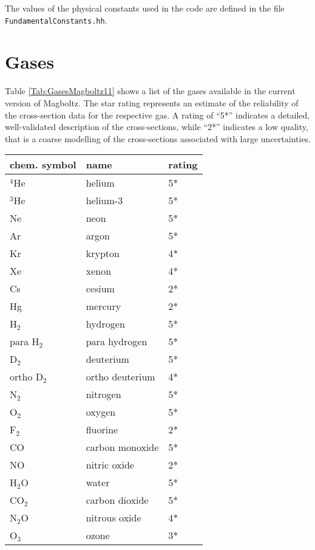 \begin{appendix}
The values of the physical constants used in the code are defined  
in the file \texttt{FundamentalConstants.hh}.

\chapter{Gases}

Table \ref{Tab:GasesMagboltz11} shows a list of the gases 
available in the current version of Magboltz. 
The star rating represents an estimate of the reliability 
of the cross-section data for the respective gas. 
A rating of ``5*'' indicates a detailed, well-validated 
description of the cross-sections, while 
``2*'' indicates a low quality, that is 
a coarse modelling of the cross-sections 
associated with large uncertainties.

\begin{longtable}{l l l}
  \toprule
   chem. symbol & name & rating \\
  \midrule
  \(^{4}\)He & helium   & 5* \\
  \(^{3}\)He & helium-3 & 5* \\
          Ne & neon     & 5* \\
          Ar & argon    & 5* \\
          Kr & krypton  & 4* \\
          Xe & xenon    & 4* \\
  \midrule
  Cs         & cesium   & 2* \\
  Hg         & mercury  & 2* \\
  \midrule
  H\(_{2}\) & hydrogen  & 5* \\
  para H\(_{2}\) & para hydrogen  & 5* \\
  D\(_{2}\) & deuterium & 5* \\
  ortho D\(_{2}\) & ortho deuterium & 4* \\
  N\(_{2}\) & nitrogen  & 5* \\
  O\(_{2}\) & oxygen    & 5* \\
  F\(_{2}\) & fluorine  & 2* \\
  \midrule
  CO         & carbon monoxide & 5* \\
  NO         & nitric oxide    & 2* \\
  \midrule
  H\(_{2}\)O & water           & 5* \\ 
  CO\(_{2}\) & carbon dioxide  & 5* \\
  N\(_{2}\)O & nitrous oxide   & 4* \\
  O\(_{3}\)  & ozone           & 3* \\

\end{longtable}
\end{appendix}
